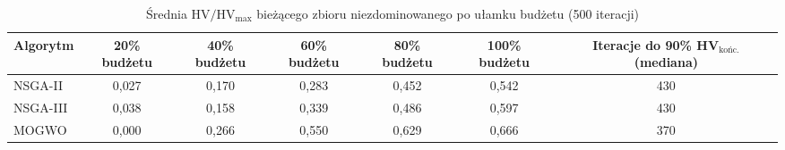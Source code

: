 \begin{table}[htbp]
    \centering
    \caption{Średnia $\mathrm{HV}/\mathrm{HV}_{\max}$ bieżącego zbioru niezdominowanego po ułamku budżetu (500 iteracji)}
    \label{tab:convergence}
    \begin{tabular}{l c c c c c c}
        \hline
        Algorytm & 20\% budżetu & 40\% budżetu & 60\% budżetu & 80\% budżetu & 100\% budżetu & Iteracje do 90\% HV$_{\text{końc.}}$ (mediana) \\
        \hline
        NSGA-II & 0{,}027 & 0{,}170 & 0{,}283 & 0{,}452 & 0{,}542 & 430 \\
        NSGA-III & 0{,}038 & 0{,}158 & 0{,}339 & 0{,}486 & 0{,}597 & 430 \\
        MOGWO & 0{,}000 & 0{,}266 & 0{,}550 & 0{,}629 & 0{,}666 & 370 \\
        \hline
    \end{tabular}
\end{table}
